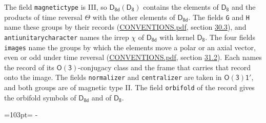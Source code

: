 \documentclass[10pt,a4paper]{article}
\newcommand{\needspace}[1]{\par\penalty-100\begingroup\dimen0=#1\relax\dimen2=\pagegoal
  \advance\dimen2-\pagetotal\ifdim\dimen0>\dimen2\relax\ifdim\dimen2>0pt\vfil\break\fi\fi
  \endgroup}
\numberwithin{equation}{section}
\newcommand{\grp}[1]{\mathsf{#1}}
\begin{document}
The field \texttt{magnetictype} is III, so $\grp{D_{8d}}(\grp{D_{8}})$ contains the elements of $\grp{D_{8}}$ and the products of time reversal $\varTheta$ with the other elements of $\grp{D_{8d}}$. The fields \texttt{G} and \texttt{H} name these groups by their records (\href{../../CONVENTIONS.pdf}{CONVENTIONS.pdf}, section \href{../../CONVENTIONS.pdf\#conv.30.3}{30.3}), and \texttt{antiunitarycharacter} names the irrep $\chi$ of $\grp{D_{8d}}$ with kernel $\grp{D_{8}}$. The four fields \texttt{images} name the groups by which the elements move a polar or an axial vector, even or odd under time reversal (\href{../../CONVENTIONS.pdf}{CONVENTIONS.pdf}, section \href{../../CONVENTIONS.pdf\#conv.31.2}{31.2}). Each names the record of its $\grp{O(3)}$-conjugacy class and the frame that carries that record onto the image. The fields \texttt{normalizer} and \texttt{centralizer} are taken in $\grp{O(3)1'}$, and both groups are of magnetic type II. The field \texttt{orbifold} of the record gives the orbifold symbols of $\grp{D_{8d}}$ and of $\grp{D_{8}}$.
\needspace{103pt}
\end{document}
